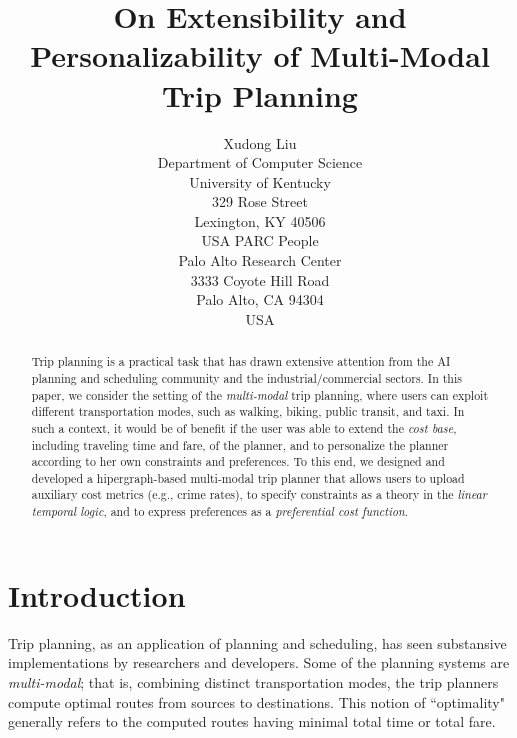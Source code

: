 \documentclass[letterpaper]{article}
\newcommand{\tit}[1]{\textit{#1}}
\begin{document}
%
\title{On Extensibility and Personalizability of Multi-Modal Trip Planning}
\author{
	Xudong Liu\\
	Department of Computer Science\\
	University of Kentucky\\
	329 Rose Street\\
	Lexington, KY 40506\\
	USA
	\And
	PARC People\\
	Palo Alto Research Center\\
	3333 Coyote Hill Road\\
	Palo Alto, CA 94304\\
	USA
}
\maketitle
\begin{abstract}
	Trip planning is a practical task that has drawn
	extensive attention from the AI planning and scheduling community
	and the industrial/commercial sectors.
	In this paper, we consider the setting of the \tit{multi-modal}
	trip planning, where users can exploit different transportation
	modes, such as walking, biking, public transit, and taxi.
	In such a context, it would be of benefit if the
	user was able to extend the \tit{cost base}, including traveling time 
	and fare, of the planner, and to personalize the planner according
	to her own constraints and preferences.
	To this end, we designed and developed a hipergraph-based multi-modal
	trip planner that allows users to upload auxiliary cost metrics (e.g.,
	crime rates), to specify constraints as a theory in the 
	\tit{linear temporal logic}, and to express preferences as a 
	\tit{preferential cost function}.
\end{abstract}

\section{Introduction}
Trip planning, as an application of planning and scheduling,
has seen substansive implementations by researchers and
developers\cite{bast2015route}.
Some of the planning systems are \tit{multi-modal}; that is,
combining distinct transportation modes, the trip planners
compute optimal routes from sources to destinations.
This notion of ``optimality" generally refers to the computed routes
having minimal total time or total fare.
\end{document}
